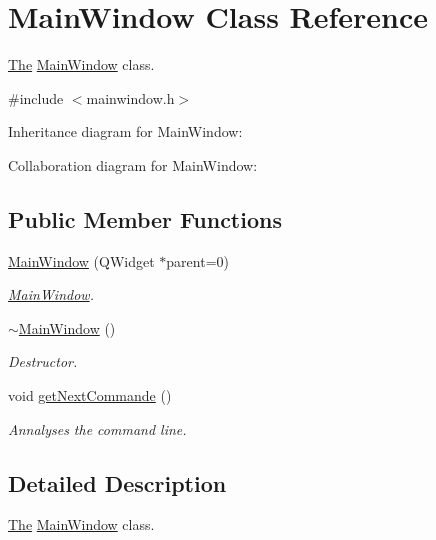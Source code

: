 \hypertarget{class_main_window}{}\section{Main\+Window Class Reference}
\label{class_main_window}


\hyperlink{class_the}{The} \hyperlink{class_main_window}{Main\+Window} class.  




{\ttfamily \#include $<$mainwindow.\+h$>$}



Inheritance diagram for Main\+Window\+:


Collaboration diagram for Main\+Window\+:
\subsection*{Public Member Functions}
\begin{DoxyCompactItemize}
\item 
\hyperlink{class_main_window_a8b244be8b7b7db1b08de2a2acb9409db}{Main\+Window} (Q\+Widget $\ast$parent=0)
\begin{DoxyCompactList}\small\item\em \hyperlink{class_main_window}{Main\+Window}. \end{DoxyCompactList}\item 
\hyperlink{class_main_window_ae98d00a93bc118200eeef9f9bba1dba7}{$\sim$\+Main\+Window} ()
\begin{DoxyCompactList}\small\item\em Destructor. \end{DoxyCompactList}\item 
void \hyperlink{class_main_window_ae9ba81c937937c6218a77ba0ac7a9461}{get\+Next\+Commande} ()\hypertarget{class_main_window_ae9ba81c937937c6218a77ba0ac7a9461}{}\label{class_main_window_ae9ba81c937937c6218a77ba0ac7a9461}

\begin{DoxyCompactList}\small\item\em Annalyses the command line. \end{DoxyCompactList}\end{DoxyCompactItemize}


\subsection{Detailed Description}
\hyperlink{class_the}{The} \hyperlink{class_main_window}{Main\+Window} class. 

